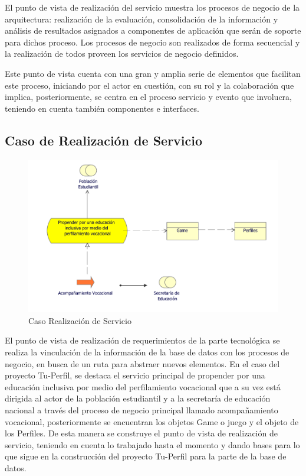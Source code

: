 El punto de vista de realización del servicio muestra los procesos de negocio de la arquitectura: realización de la evaluación, consolidación de la información y análisis de resultados asignados a componentes de aplicación que serán de soporte para dichos proceso. Los procesos de negocio son realizados de forma secuencial y la realización de todos proveen los servicios de negocio definidos.

Este punto de vista cuenta con una gran y amplia serie de elementos que facilitan este proceso, iniciando por el actor en cuestión, con su rol y la colaboración que implica, posteriormente, se centra en el proceso servicio y evento que involucra, teniendo en cuenta también componentes e interfaces.


\subsection{Caso  de Realización de Servicio}
\begin{figure}[h!]
	\centering
	\includegraphics[width=1.05\linewidth]{imgs/caso/RealizaServicio}
	\caption{Caso Realización de Servicio}
\end{figure}

El punto de vista de realización de requerimientos de la parte tecnológica se realiza la vinculación de la información de la base de datos con los procesos de negocio, en busca de un ruta para abstraer nuevos elementos. En el caso del proyecto Tu-Perfil, se destaca el servicio principal de propender por una educación inclusiva por medio del perfilamiento vocacional que a su vez está dirigida al actor de la población estudiantil y a la secretaría de educación nacional a través del proceso de negocio principal llamado acompañamiento vocacional, posteriormente se encuentran los objetos Game o juego y el objeto de los Perfiles. De esta manera se construye el punto de vista de realización de servicio, teniendo en cuenta lo trabajado hasta el momento y dando bases para lo que sigue en la construcción del proyecto Tu-Perfil para la parte de la base de datos.